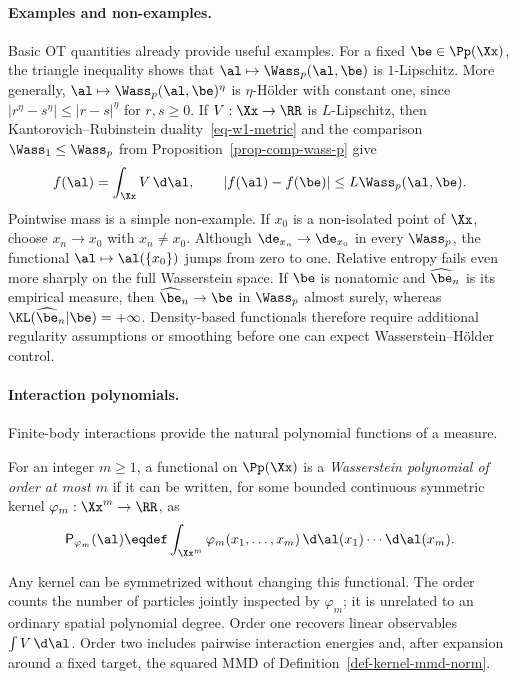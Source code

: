 \paragraph{Examples and non-examples.}

Basic OT quantities already provide useful examples. For a fixed \(\be\in\Pp(\Xx)\), the triangle inequality shows that \(\al\mapsto\Wass_p(\al,\be)\) is \(1\)-Lipschitz. More generally, \(\al\mapsto\Wass_p(\al,\be)^\eta\) is \(\eta\)-H\"older with constant one, since \(|r^\eta-s^\eta|\leq|r-s|^\eta\) for \(r,s\geq0\). If \(V:\Xx\to\RR\) is \(L\)-Lipschitz, then Kantorovich--Rubinstein duality~\eqref{eq-w1-metric} and the comparison \(\Wass_1\leq\Wass_p\) from Proposition~\ref{prop-comp-wass-p} give
\[
	f(\al)=\int_{\Xx} V\,\d\al,
	\qquad
	|f(\al)-f(\be)|\leq L\Wass_p(\al,\be).
\]
Pointwise mass is a simple non-example. If \(x_0\) is a non-isolated point of \(\Xx\), choose \(x_n\to x_0\) with \(x_n\neq x_0\). Although \(\de_{x_n}\to\de_{x_0}\) in every \(\Wass_p\), the functional \(\al\mapsto\al(\{x_0\})\) jumps from zero to one. Relative entropy fails even more sharply on the full Wasserstein space. If \(\be\) is nonatomic and \(\widehat\be_n\) is its empirical measure, then \(\widehat\be_n\to\be\) in \(\Wass_p\) almost surely, whereas \(\KL(\widehat\be_n|\be)=+\infty\). Density-based functionals therefore require additional regularity assumptions or smoothing before one can expect Wasserstein--H\"older control.

\paragraph{Interaction polynomials.}

Finite-body interactions provide the natural polynomial functions of a measure.

\begin{defn}\label{def-wasserstein-polynomial}
	For an integer \(m\geq1\), a functional on \(\Pp(\Xx)\) is a \emph{Wasserstein polynomial of order at most \(m\)} if it can be written, for some bounded continuous symmetric kernel \(\varphi_m:\Xx^m\to\RR\), as
	\begin{equation}\label{eq-wasserstein-interaction-polynomial}
		\mathsf P_{\varphi_m}(\al)
		\eqdef
		\int_{\Xx^m}\varphi_m(x_1,\ldots,x_m)
		\,\d\al(x_1)\cdots\d\al(x_m).
	\end{equation}
\end{defn}
Any kernel can be symmetrized without changing this functional. The order counts the number of particles jointly inspected by \(\varphi_m\); it is unrelated to an ordinary spatial polynomial degree. Order one recovers linear observables \(\int V\,\d\al\). Order two includes pairwise interaction energies and, after expansion around a fixed target, the squared MMD of Definition~\ref{def-kernel-mmd-norm}.

